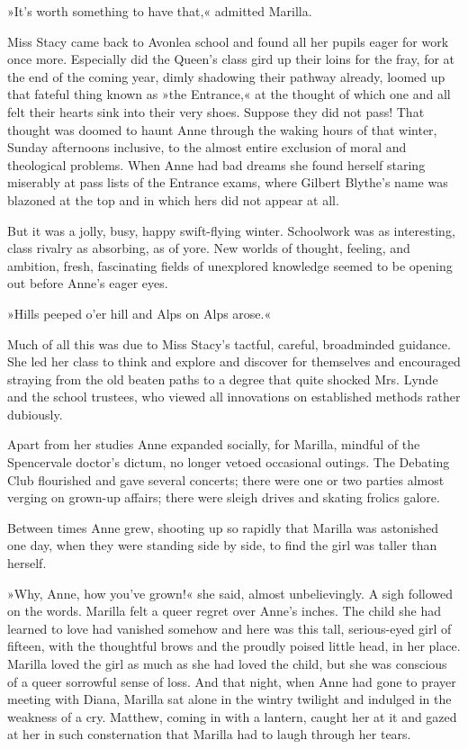 »It's worth something to have that,« admitted Marilla.

Miss Stacy came back to Avonlea school and found all her pupils eager for work once more. Especially did the Queen's class gird up their loins for the fray, for at the end of the coming year, dimly shadowing their pathway already, loomed up that fateful thing known as »the Entrance,« at the thought of which one and all felt their hearts sink into their very shoes. Suppose they did not pass! That thought was doomed to haunt Anne through the waking hours of that winter, Sunday afternoons inclusive, to the almost entire exclusion of moral and theological problems. When Anne had bad dreams she found herself staring miserably at pass lists of the Entrance exams, where Gilbert Blythe's name was blazoned at the top and in which hers did not appear at all.

But it was a jolly, busy, happy swift-flying winter. Schoolwork was as interesting, class rivalry as absorbing, as of yore. New worlds of thought, feeling, and ambition, fresh, fascinating fields of unexplored knowledge seemed to be opening out before Anne's eager eyes.

»Hills peeped o'er hill and Alps on Alps arose.«

Much of all this was due to Miss Stacy's tactful, careful, broadminded guidance. She led her class to think and explore and discover for themselves and encouraged straying from the old beaten paths to a degree that quite shocked Mrs. Lynde and the school trustees, who viewed all innovations on established methods rather dubiously.

Apart from her studies Anne expanded socially, for Marilla, mindful of the Spencervale doctor's dictum, no longer vetoed occasional outings. The Debating Club flourished and gave several concerts; there were one or two parties almost verging on grown-up affairs; there were sleigh drives and skating frolics galore.

Between times Anne grew, shooting up so rapidly that Marilla was astonished one day, when they were standing side by side, to find the girl was taller than herself.

»Why, Anne, how you've grown!« she said, almost unbelievingly. A sigh followed on the words. Marilla felt a queer regret over Anne's inches. The child she had learned to love had vanished somehow and here was this tall, serious-eyed girl of fifteen, with the thoughtful brows and the proudly poised little head, in her place. Marilla loved the girl as much as she had loved the child, but she was conscious of a queer sorrowful sense of loss. And that night, when Anne had gone to prayer meeting with Diana, Marilla sat alone in the wintry twilight and indulged in the weakness of a cry. Matthew, coming in with a lantern, caught her at it and gazed at her in such consternation that Marilla had to laugh through her tears.

